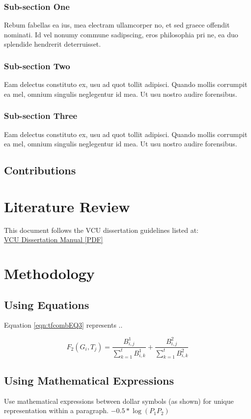 \documentclass[copyright, reqno]{vcuthesis}
\numberwithin{equation}{chapter}
\begin{document}
\subsection{Sub-section One}
Rebum fabellas ea ius, mea electram ullamcorper no, et sed graece offendit nominati. Id vel nonumy commune sadipscing, eros philosophia pri ne, ea duo splendide hendrerit deterruisset. 
\subsection{Sub-section Two}
Eam delectus constituto ex, usu ad quot tollit adipisci. Quando mollis corrumpit ea mel, omnium singulis neglegentur id mea. Ut usu nostro audire forensibus.
\subsection{Sub-section Three}
Eam delectus constituto ex, usu ad quot tollit adipisci. Quando mollis corrumpit ea mel, omnium singulis neglegentur id mea. Ut usu nostro audire forensibus.
\section{Contributions}

\chapter{Literature Review \label{chap:litreview}}
This document follows the VCU dissertation guidelines listed at:\\ \href{http://www.graduate.vcu.edu/pdfs/Thesis\%20and\%20Dissertation\%20Manual\%20Fall\%202012.pdf}{VCU Dissertation Manual [PDF]}
\chapter{Methodology \label{chap:methods}}
\section{Using Equations}
Equation \ref{eqn:tfcombEQ3} represents ..

\begin{equation}
F_{2}(G_{i}, T_{j}) = \dfrac{B^{1}_{i,j}}{\sum\limits_{k=1}^{t}B^{1}_{i,k}} + \dfrac{B^{2}_{i,j}}{\sum\limits_{k=1}^{t}B^{2}_{i,k}}
\label{eqn:tfcombEQ3}
\end{equation}

\section{Using Mathematical Expressions}
Use mathematical expressions between dollar symbols (as shown) for unique representation within a paragraph.
$-0.5*\log (P_{1}P_{2})$ \\
\end{document}
